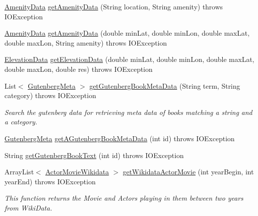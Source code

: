 \begin{DoxyCompactItemize}
\hyperlink{classbridges_1_1data__src__dependent_1_1_amenity_data}{Amenity\+Data} \hyperlink{classbridges_1_1connect_1_1_data_source_aa25f4d7521aa1ad788b60816eb2088db}{get\+Amenity\+Data} (String location, String amenity)  throws I\+O\+Exception 
\item 
\hyperlink{classbridges_1_1data__src__dependent_1_1_amenity_data}{Amenity\+Data} \hyperlink{classbridges_1_1connect_1_1_data_source_a4fdb7ddbeecaa30a4e6972c0b537bb44}{get\+Amenity\+Data} (double min\+Lat, double min\+Lon, double max\+Lat, double max\+Lon, String amenity)  throws I\+O\+Exception 
\item 
\hyperlink{classbridges_1_1data__src__dependent_1_1_elevation_data}{Elevation\+Data} \hyperlink{classbridges_1_1connect_1_1_data_source_ac3aec28786d148e6b3554c78679bb4c2}{get\+Elevation\+Data} (double min\+Lat, double min\+Lon, double max\+Lat, double max\+Lon, double res)  throws I\+O\+Exception 
\item 
List$<$ \hyperlink{classbridges_1_1data__src__dependent_1_1_gutenberg_meta}{Gutenberg\+Meta} $>$ \hyperlink{classbridges_1_1connect_1_1_data_source_a7f27778f3a8fcd01a2504b19d35eda14}{get\+Gutenberg\+Book\+Meta\+Data} (String term, String category)  throws I\+O\+Exception
\begin{DoxyCompactList}\small\item\em Search the gutenberg data for retrieving meta data of books matching a string and a category. \end{DoxyCompactList}\item 
\hyperlink{classbridges_1_1data__src__dependent_1_1_gutenberg_meta}{Gutenberg\+Meta} \hyperlink{classbridges_1_1connect_1_1_data_source_a1f0ec9eb03a7e3631146415c317a1694}{get\+A\+Gutenberg\+Book\+Meta\+Data} (int id)  throws I\+O\+Exception 
\item 
String \hyperlink{classbridges_1_1connect_1_1_data_source_ae6a17bd40228b89350fa186a2caad292}{get\+Gutenberg\+Book\+Text} (int id)  throws I\+O\+Exception
\item 
Array\+List$<$ \hyperlink{classbridges_1_1data__src__dependent_1_1_actor_movie_wikidata}{Actor\+Movie\+Wikidata} $>$ \hyperlink{classbridges_1_1connect_1_1_data_source_a919756dc487ad42a2843d9d9cb71371c}{get\+Wikidata\+Actor\+Movie} (int year\+Begin, int year\+End)  throws I\+O\+Exception 
\begin{DoxyCompactList}\small\item\em This function returns the Movie and Actors playing in them between two years from Wiki\+Data. \end{DoxyCompactList}\item 

\end{DoxyCompactItemize}
